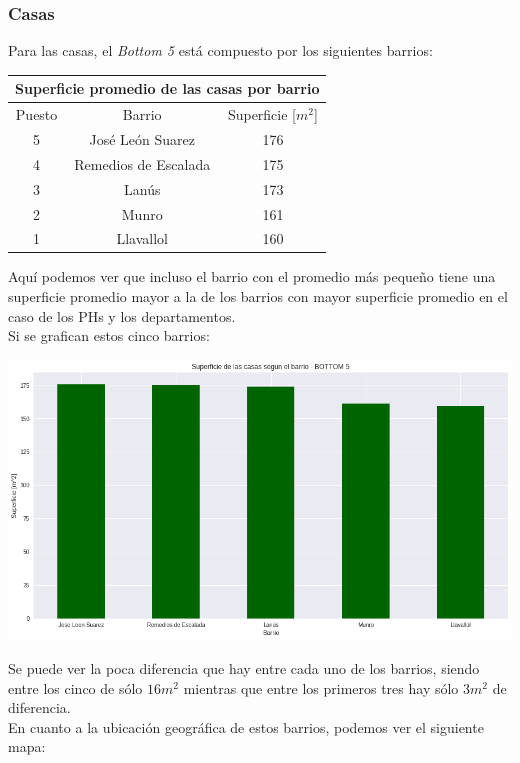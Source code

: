 \documentclass[a4paper, 10pt]{article}
\newcommand\tab[1][0.5cm]{\hspace*{#1}}
\begin{document}
				\subsubsection{Casas}
					Para las casas, el \emph{Bottom 5} está compuesto por los siguientes barrios:
					\begin{center}
						\begin{tabular}{ |c|c|c| }
							\hline
							\multicolumn{3}{|c|}{Superficie promedio de las casas por barrio}\\
							\hline
							\hline
							Puesto & Barrio & Superficie [$m^2$]\\
							\hline
							5 & José León Suarez & 176\\
							4 & Remedios de Escalada & 175\\
							3 & Lanús & 173\\
							2 & Munro & 161 \\
							1 & Llavallol & 160\\
							\hline
						\end{tabular}
					\end{center}
					\tab Aquí podemos ver que incluso el barrio con el promedio más pequeño tiene una superficie promedio mayor
					a la de los barrios con mayor superficie promedio en el caso de los PHs y los departamentos. \\
					\tab Si se grafican estos cinco barrios:
					\begin{center}
   		    				\includegraphics[width=\textwidth]{images/houseSurfaceBottomBar}
				  	\end{center}
				  	\tab Se puede ver la poca diferencia que hay entre cada uno de los barrios, siendo entre los cinco de sólo
				  	$16m^2$ mientras que entre los primeros tres hay sólo $3m^2$ de diferencia. \\
				  	\tab En cuanto a la ubicación geográfica de estos barrios, podemos ver el siguiente mapa:
\end{document}
